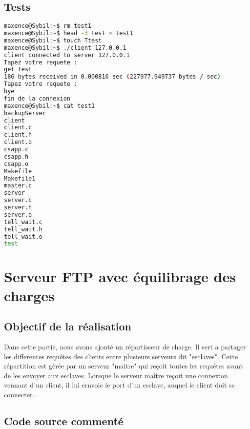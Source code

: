 \documentclass{report}
\begin{document}
      \section{Tests}
      \begin{lstlisting}[frame=single,basicstyle=\footnotesize,language=bash]
maxence@Sybil:~$ rm test1
maxence@Sybil:~$ head -3 test > test1
maxence@Sybil:~$ touch Ttest
maxence@Sybil:~$ ./client 127.0.0.1
client connected to server 127.0.0.1
Tapez votre requete :
get test
186 bytes received in 0.000816 sec (227977.949737 bytes / sec)
Tapez votre requete :
bye
fin de la connexion
maxence@Sybil:~$ cat test1
backupServer
client
client.c
client.h
client.o
csapp.c
csapp.h
csapp.o
Makefile
Makefile1
master.c
server
server.c
server.h
server.o
tell_wait.c
tell_wait.h
tell_wait.o
test
\end{lstlisting}

    \chapter{Serveur FTP avec \'equilibrage des charges}
      \section{Objectif de la r\'ealisation}
	Dans cette partie, nous avons ajout\'e un r\'epartisseur de charge. Il sert a partager les differentes requ\^etes des clients entre
  plusieurs serveurs dit "esclaves". Cette r\'epartition est g\`er\'ee par un serveur "maitre" qui re\c coit toutes les requ\^etes
  avant de les envoyer aux esclaves. Lorsque le serveur ma\^itre re\c coit une connexion vennant d'un client, il lui ernvoie le port d'un esclave,
  auquel le client doit se connecter.
      \section{Code source comment\'e}
\end{document}
